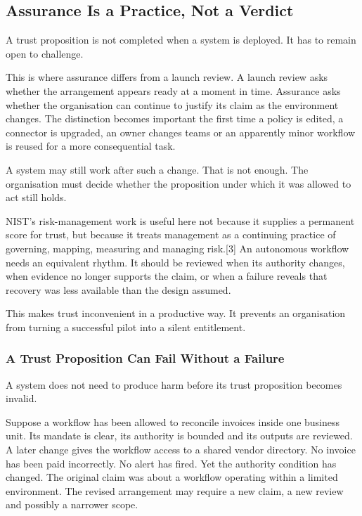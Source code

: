 \subsection{Assurance Is a Practice, Not a
Verdict}\label{assurance-is-a-practice-not-a-verdict}

A trust proposition is not completed when a system is deployed. It has
to remain open to challenge.

This is where assurance differs from a launch review. A launch review
asks whether the arrangement appears ready at a moment in time.
Assurance asks whether the organisation can continue to justify its
claim as the environment changes. The distinction becomes important the
first time a policy is edited, a connector is upgraded, an owner changes
teams or an apparently minor workflow is reused for a more consequential
task.

A system may still work after such a change. That is not enough. The
organisation must decide whether the proposition under which it was
allowed to act still holds.

NIST's risk-management work is useful here not because it supplies a
permanent score for trust, but because it treats management as a
continuing practice of governing, mapping, measuring and managing
risk.{[}3{]} An autonomous workflow needs an equivalent rhythm. It
should be reviewed when its authority changes, when evidence no longer
supports the claim, or when a failure reveals that recovery was less
available than the design assumed.

This makes trust inconvenient in a productive way. It prevents an
organisation from turning a successful pilot into a silent entitlement.

\subsubsection{A Trust Proposition Can Fail Without a
Failure}\label{a-trust-proposition-can-fail-without-a-failure}

A system does not need to produce harm before its trust proposition
becomes invalid.

Suppose a workflow has been allowed to reconcile invoices inside one
business unit. Its mandate is clear, its authority is bounded and its
outputs are reviewed. A later change gives the workflow access to a
shared vendor directory. No invoice has been paid incorrectly. No alert
has fired. Yet the authority condition has changed. The original claim
was about a workflow operating within a limited environment. The revised
arrangement may require a new claim, a new review and possibly a
narrower scope.

